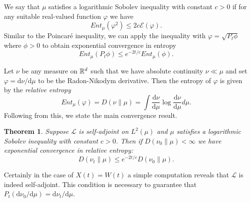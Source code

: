 \documentclass{article}
\newtheorem{theorem}{Theorem}[section]
\newcommand{\Bcal}[1]{\mathcal{#1}}
\newcommand{\Brm}[1]{\mathrm{#1}}
\begin{document}
\begin{appendices}
We say that \(\mu\) satisfies a logarithmic Sobolev inequality with constant \(c > 0\) if for any suitable real-valued function \(\varphi\) we have
\begin{equation*}
    Ent_{\mu}(\varphi^2) \leq 2 c \Bcal{E}(\varphi).
\end{equation*}
Similar to the Poincar\'{e} inequality, we can apply the inequality with \(\varphi = \sqrt{P_t \phi}\) where \(\phi > 0\) to obtain exponential convergence in entropy
\begin{equation*}
    Ent_{\mu}(P_t \phi) \leq e^{-2t/c} Ent_{\mu}(\phi).
\end{equation*}

Let \(\nu\) be any measure on \(\Bbb{R}^d\) such that we have absolute continuity \(\nu \ll \mu\) and set \(\varphi = \Brm{d}\nu / \Brm{d}\mu\) to be the Radon-Nikodym derivative. Then the entropy of \(\varphi\) is given by the \textit{relative entropy}
\begin{equation*}
    Ent_{\mu}(\varphi) = D(\nu \| \mu) = \int \frac{\Brm{d} \nu}{\Brm{d} \mu} \log{\frac{\Brm{d} \nu}{\Brm{d} \mu}} d\mu.
\end{equation*}
Following from this, we state the main convergence result.
\begin{theorem}
Suppose \(\Bcal{L}\) is self-adjoint on \(L^2(\mu)\) and \(\mu\) satisfies a logarithmic Sobolev inequality with constant \(c > 0\). Then if \(D(\nu_0 \| \mu) < \infty\) we have exponential convergence in relative entropy: 
\begin{equation*}
    D(\nu_t \| \mu) \leq e^{-2t/c} D(\nu_0 \| \mu).
\end{equation*}
\end{theorem}

Certainly in the case of \(X(t) = W(t)\) a simple computation reveals that \(\Bcal{L}\) is indeed self-adjoint. This condition is necessary to guarantee that \(P_t (\Brm{d}\nu_0 / \Brm{d}\mu) = \Brm{d}\nu_t / \Brm{d}\mu\).
\end{appendices}
\end{document}
